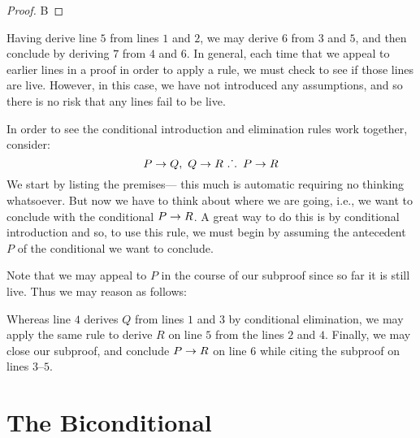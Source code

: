 \begin{proof}
	 \pr{}
	 \pr{}
	 \pr{}
	 
	 {B} 
	 
	 
\end{proof}

Having derive line $5$ from lines $1$ and $2$, we may derive $6$ from $3$ and $5$, and then conclude by deriving $7$ from $4$ and $6$.
In general, each time that we appeal to earlier lines in a proof in order to apply a rule, we must check to see if those lines are live.
However, in this case, we have not introduced any assumptions, and so there is no risk that any lines fail to be live.

In order to see the conditional introduction and elimination rules work together, consider:
	$$P \rightarrow Q,\ Q \rightarrow R\ \ldotp\dot{}\,\ldotp \ P \rightarrow R$$
We start by listing the premises--- this much is automatic requiring no thinking whatsoever.
But now we have to think about where we are going, i.e., we want to conclude with the conditional $P\rightarrow R$.
A great way to do this is by conditional introduction and so, to use this rule, we must begin by assuming the antecedent $P$ of the conditional we want to conclude.
\begin{fitchproof}
	 \pr{}
	 \pr{}
	\open
		 
	\close
\end{fitchproof}
Note that we may appeal to $P$ in the course of our subproof since so far it is still live.
Thus we may reason as follows:
\label{HSproof}
\begin{fitchproof}
	 \pr{}
	 \pr{}
	\open
		 
	\close
\end{fitchproof}
Whereas line $4$ derives $Q$ from lines $1$ and $3$ by conditional elimination, we may apply the same rule to derive $R$ on line $5$ from the lines $2$ and $4$.
Finally, we may close our subproof, and conclude $P \rightarrow R$ on line $6$ while citing the subproof on lines $3$--$5$. 






\section{The Biconditional}

